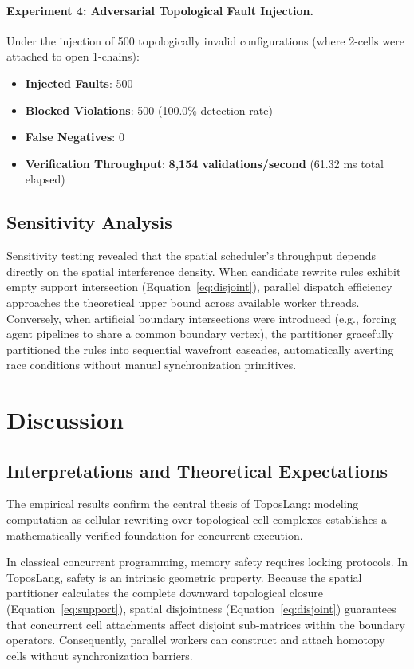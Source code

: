 \documentclass[10pt,a4paper]{article}
\begin{document}
\paragraph{Experiment 4: Adversarial Topological Fault Injection.}
Under the injection of 500 topologically invalid configurations (where 2-cells were attached to open 1-chains):
\begin{itemize}
    \item \textbf{Injected Faults}: 500
    \item \textbf{Blocked Violations}: 500 (100.0\% detection rate)
    \item \textbf{False Negatives}: 0
    \item \textbf{Verification Throughput}: \textbf{8,154 validations/second} (61.32 ms total elapsed)
\end{itemize}

\subsection{Sensitivity Analysis}
Sensitivity testing revealed that the spatial scheduler's throughput depends directly on the spatial interference density. When candidate rewrite rules exhibit empty support intersection (Equation~\ref{eq:disjoint}), parallel dispatch efficiency approaches the theoretical upper bound across available worker threads. Conversely, when artificial boundary intersections were introduced (e.g., forcing agent pipelines to share a common boundary vertex), the partitioner gracefully partitioned the rules into sequential wavefront cascades, automatically averting race conditions without manual synchronization primitives.

\section{Discussion}

\subsection{Interpretations and Theoretical Expectations}
The empirical results confirm the central thesis of ToposLang: modeling computation as cellular rewriting over topological cell complexes establishes a mathematically verified foundation for concurrent execution.

In classical concurrent programming, memory safety requires locking protocols. In ToposLang, safety is an intrinsic geometric property. Because the spatial partitioner calculates the complete downward topological closure (Equation~\ref{eq:support}), spatial disjointness (Equation~\ref{eq:disjoint}) guarantees that concurrent cell attachments affect disjoint sub-matrices within the boundary operators. Consequently, parallel workers can construct and attach homotopy cells without synchronization barriers.
\end{document}

